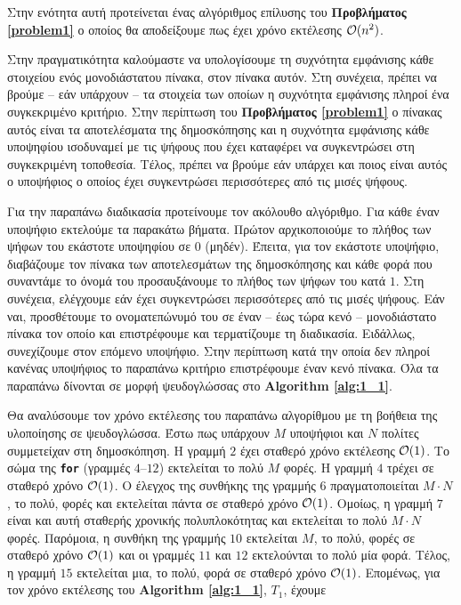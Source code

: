 	Στην ενότητα αυτή προτείνεται ένας αλγόριθμος επίλυσης του \textbf{Προβλήματος \ref{problem1}} ο οποίος θα αποδείξουμε πως έχει χρόνο εκτέλεσης $\mathcal{O}(n^2)$.\par
	\begin{wrapfigure}{R}{0.56\textwidth}
		\begin{minipage}{0.56\textwidth}
			\vspace*{-20pt}
			
		\end{minipage}
	\end{wrapfigure}
	Στην πραγματικότητα καλούμαστε να υπολογίσουμε τη συχνότητα εμφάνισης κάθε στοιχείου ενός μονοδιάστατου πίνακα, στον πίνακα αυτόν. Στη συνέχεια, πρέπει να βρούμε -- εάν υπάρχουν --  τα στοιχεία των οποίων η συχνότητα εμφάνισης πληροί ένα συγκεκριμένο κριτήριο. Στην περίπτωση του \textbf{Προβλήματος \ref{problem1}} ο πίνακας αυτός είναι τα αποτελέσματα της δημοσκόπησης και η συχνότητα εμφάνισης κάθε υποψηφίου ισοδυναμεί με τις ψήφους που έχει καταφέρει να συγκεντρώσει στη συγκεκριμένη τοποθεσία. Τέλος, πρέπει να βρούμε εάν υπάρχει και ποιος είναι αυτός ο υποψήφιος ο οποίος έχει συγκεντρώσει περισσότερες από τις μισές ψήφους.\par
	Για την παραπάνω διαδικασία προτείνουμε τον ακόλουθο αλγόριθμο. Για κάθε έναν υποψήφιο εκτελούμε τα παρακάτω βήματα. Πρώτον αρχικοποιούμε το πλήθος των ψήφων του εκάστοτε υποψηφίου σε $0$ (μηδέν). Έπειτα, για τον εκάστοτε υποψήφιο, διαβάζουμε τον πίνακα των αποτελεσμάτων της δημοσκόπησης και κάθε φορά που συναντάμε το όνομά του προσαυξάνουμε το πλήθος των ψήφων του κατά $1$. Στη συνέχεια, ελέγχουμε εάν έχει συγκεντρώσει περισσότερες από τις μισές ψήφους. Εάν ναι, προσθέτουμε το ονοματεπώνυμό του σε έναν -- έως τώρα κενό -- μονοδιάστατο πίνακα τον οποίο και επιστρέφουμε και τερματίζουμε τη διαδικασία. Ειδάλλως, συνεχίζουμε στον επόμενο υποψήφιο. Στην περίπτωση κατά την οποία δεν πληροί κανένας υποψήφιος το παραπάνω κριτήριο επιστρέφουμε έναν κενό πίνακα. Όλα τα παραπάνω δίνονται σε μορφή ψευδογλώσσας στο \textbf{Algorithm \ref{alg:1_1}}.\par
	Θα αναλύσουμε τον χρόνο εκτέλεσης του παραπάνω αλγορίθμου με τη βοήθεια της υλοποίησης σε ψευδογλώσσα. Έστω πως υπάρχουν $M$ υποψήφιοι και $N$ πολίτες συμμετείχαν στη δημοσκόπηση. Η γραμμή $2$ έχει σταθερό χρόνο εκτέλεσης $\mathcal{O}(1)$. Το σώμα της \texttt{\textbf{for}} (γραμμές $4$--$12$) εκτελείται το πολύ $M$ φορές. Η γραμμή $4$ τρέχει σε σταθερό χρόνο $\mathcal{O}(1)$. Ο έλεγχος της συνθήκης της γραμμής $6$ πραγματοποιείται $M\cdot N$, το πολύ, φορές και εκτελείται πάντα σε σταθερό χρόνο $\mathcal{O}(1)$. Ομοίως, η γραμμή $7$ είναι και αυτή σταθερής χρονικής πολυπλοκότητας και εκτελείται το πολύ $M\cdot N$ φορές. Παρόμοια, η συνθήκη της γραμμής $10$ εκτελείται $M$, το πολύ, φορές σε σταθερό χρόνο $\mathcal{O}(1)$ και οι γραμμές $11$ και $12$  εκτελούνται το πολύ μία φορά. Τέλος, η γραμμή $15$ εκτελείται μια, το πολύ, φορά σε σταθερό χρόνο $\mathcal{O}(1)$. Επομένως, για τον χρόνο εκτέλεσης του \textbf{Algorithm \ref{alg:1_1}}, $T_1$, έχουμε
